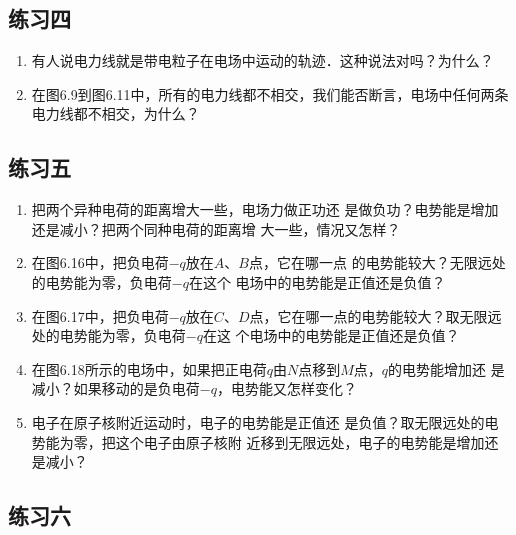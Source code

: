 \subsection{练习四}

\begin{enumerate}
	\item 有人说电力线就是带电粒子在电场中运动的轨迹．这种说法对吗？为什么？
	\item 在图6.9到图6.11中，所有的电力线都不相交，我们能否断言，电场中任何两条电力线都不相交，为什么？
\end{enumerate}


\subsection{练习五}

\begin{enumerate}
	\item 把两个异种电荷的距离增大一些，电场力做正功还
是做负功？电势能是增加还是减小？把两个同种电荷的距离增
大一些，情况又怎样？
\item 在图6.16中，把负电荷$-q$放在$A$、$B$点，它在哪一点
的电势能较大？无限远处的电势能为零，负电荷$-q$在这个
电场中的电势能是正值还是负值？
\item 在图6.17中，把负电荷$-q$放在$C$、$D$点，它在哪一点的电势能较大？取无限远处的电势能为零，负电荷$-q$在这
个电场中的电势能是正值还是负值？
\item 在图6.18所示的电场中，如果把正电荷$q$由$N$点移到$M$点，$q$的电势能增加还
是减小？如果移动的是负电荷$-q$，电势能又怎样变化？
\begin{figure}[htp]\centering

    \caption{}
\end{figure}	

\item  电子在原子核附近运动时，电子的电势能是正值还
是负值？取无限远处的电势能为零，把这个电子由原子核附
近移到无限远处，电子的电势能是增加还是减小？
\end{enumerate}



\subsection{练习六}

